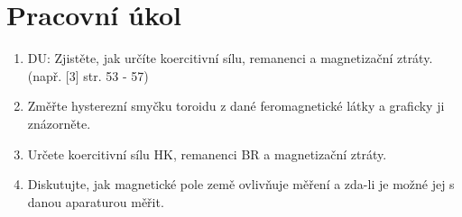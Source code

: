 \section{Pracovní úkol}

\begin{enumerate}
\item DU: Zjistěte, jak určíte koercitivní sílu, remanenci a magnetizační ztráty. (např.
[3] str. 53 - 57)
\item  Změřte hysterezní smyčku toroidu z dané feromagnetické látky a graficky ji znázorněte.
\item  Určete koercitivní sílu HK, remanenci BR a magnetizační ztráty.
\item  Diskutujte, jak magnetické pole země ovlivňuje měření a zda-li je možné jej s danou aparaturou
měřit.
\end{enumerate}

